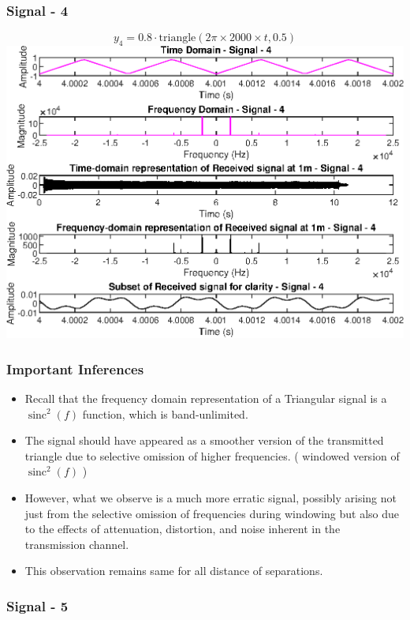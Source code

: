 \documentclass{report}
\DeclareMathOperator{\sinc}{sinc}
\begin{document}
\newpage
\subsubsection{Signal - 4}

$$ y_4 = 0.8 \cdot \text{triangle}(2 \pi \times 2000 \times t, 0.5) $$
\includegraphics[width=1.1\linewidth]{1_4.eps}


\subsubsection{Important Inferences}

\begin{itemize}
    \item Recall that the frequency domain representation of a Triangular signal is  a $\sinc^2(f)$ function, which is band-unlimited. 
    \item The signal should have appeared as a smoother version of the transmitted triangle due to selective omission of higher frequencies. ( windowed version of $\sinc^2(f)$ )
    \item However, what we observe is a much more erratic signal, possibly arising not just from the selective omission of frequencies during windowing but also due to the effects of attenuation, distortion, and noise inherent in the transmission channel.
    \item This observation remains same for all distance of separations.
\end{itemize}






\newpage
\subsubsection{Signal - 5}
\end{document}
